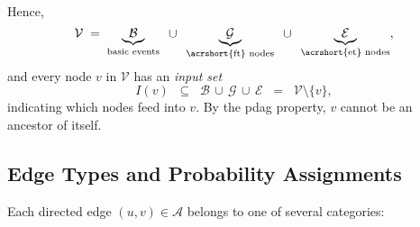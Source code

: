 Hence, 
\[
\mathcal{V} \;=\;
\underbrace{\mathcal{B}}_{\text{basic events}}
\;\;\cup\;\;
\underbrace{\mathcal{G}}_{\text{\acrshort{ft} nodes}}
\;\;\cup\;\;
\underbrace{\mathcal{E}}_{\text{\acrshort{et} nodes}},
\]
and every node \(v\) in \(\mathcal{V}\) has an \emph{input set}
\[
I(v)
\;\;\subseteq\;\;
\mathcal{B}\,\cup\,\mathcal{G}\,\cup\,\mathcal{E}
\;\;=\;\;\mathcal{V}\setminus\{v\},
\]
indicating which nodes feed into \(v\).  By the \acrshort{pdag} property, \(v\) cannot be an ancestor of itself.

\subsection{Edge Types and Probability Assignments}

Each directed edge \((u,v)\in \mathcal{A}\) belongs to one of several categories:


